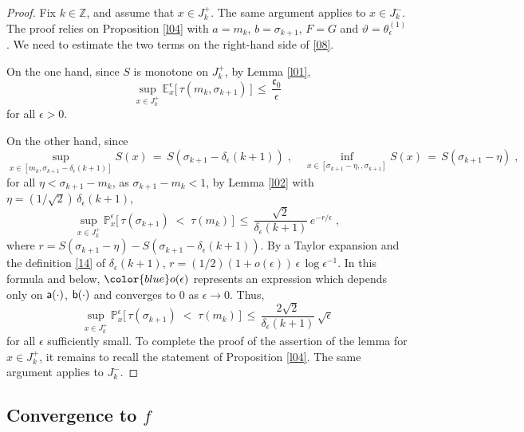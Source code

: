 \documentclass[reqno]{amsart}
\theoremstyle{plain}
\theoremstyle{definition}
\newcommand{\mf}[1]{{\mathfrak #1}}
\newcommand{\bb}[1]{{\mathbb #1}}
\newcommand{\mss}[1]{{\textsf #1}}
\newcounter{as}[section]
\newcommand{\<}{\langle}
\renewcommand{\>}{\rangle}
\begin{document}
\begin{proof}
Fix $k\in \bb Z$, and assume that $x\in J^+_k$. The same argument
applies to $x\in J^-_k$. The proof relies on Proposition \ref{l04}
with $a=m_k$, $b=\sigma_{k+1}$, $F=G$ and $\vartheta =
\theta^{(1)}_\epsilon$. We need to estimate the two terms on the
right-hand side of \eqref{08}.

On the one hand, since $S$ is monotone on $J^+_k$, by Lemma
\ref{l01},
\begin{equation*}
\sup_{x\in J^+_k}
\bb E^\epsilon_{x}\big[\, \tau(m_k, \sigma_{k+1})
\,\big] \,\leq\, \frac{\mf c_0}{\epsilon}
\end{equation*}
for all $\epsilon > 0$.

On the other hand, since
\begin{equation*}
\sup_{x \in [m_k, \sigma_{k+1} - \delta_{\epsilon}(k+1)]}  S(x)
\,=\, S(\sigma_{k+1} - \delta_{\epsilon}(k+1)) \;, \quad
\inf_{x \in [\sigma_{k+1} - \eta, , \sigma_{k+1}] } S(x)
\,=\, S(\sigma_{k+1} - \eta)\;, 
\end{equation*}
for all $\eta < \sigma_{k+1} - m_k$, as $\sigma_{k+1} - m_k<1$, by
Lemma \ref{l02} with
$\eta= (1/\sqrt{2}) \, \delta_{\epsilon}(k+1)$, 
\begin{equation*}
\sup_{x\in J^+_k}
\bb P^\epsilon_{x}\big[\,\tau(\sigma_{k+1})\; < \;
\tau(m_{k})\,\big] \,\leq\,
\frac{\sqrt{2}}{\delta_\epsilon (k+1)}\, e^{-r/\epsilon}\;, 
\end{equation*}
where
$r= S(\sigma_{k+1} - \eta) - S(\sigma_{k+1} -
\delta_{\epsilon}(k+1))$.  By a Taylor expansion and the definition
\eqref{14} of $\delta_{\epsilon}(k+1)$,
$r = (1/2) (1+o(\epsilon)) \, \epsilon \, \log \epsilon^{-1} $. In
this formula and below, $\color{blue} o(\epsilon)$ represents an
expression which depends only on $\mss a(\cdot)$, $\mss b(\cdot)$ and
converges to $0$ as $\epsilon\to 0$. Thus,
\begin{equation*}
\sup_{x\in J^+_k}
\bb P_{x}^\epsilon\big[\, \tau(\sigma_{k+1})\; < \;
\tau(m_{k})\,\big] \,\leq\,
\frac{2 \sqrt{2}}{\delta_\epsilon (k+1)}\, \sqrt{\epsilon} 
\end{equation*}
for all $\epsilon$ sufficiently small.  To complete the proof of the
assertion of the lemma for $x\in J^+_k$, it remains to recall the
statement of Proposition \ref{l04}. The same argument applies to
$J^-_k$.
\end{proof}

\subsection*{Convergence to $f$}
\end{document}
